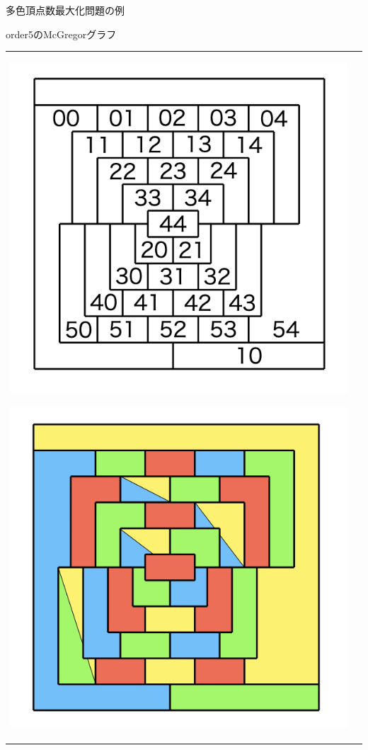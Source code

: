 \documentclass[dvipdfmx,11pt]{beamer}
\begin{document}
\begin{frame}{多色頂点数最大化問題の例}

 \begin{exampleblock}{order5のMcGregorグラフ\cite{Knuth:TAOCP:SAT}}
  \begin{tabular}{cc}
   \begin{minipage}[t]{0.5\linewidth}
    \centering
    \includegraphics[scale=0.2]{fig/order5.png}
   \end{minipage}
   \begin{minipage}[t]{0.5\linewidth}
    \centering
    \includegraphics[scale=0.2]{fig/order5_mult.png}
   \end{minipage}
  \end{tabular}
 \end{exampleblock}


\end{frame}
\end{document}
